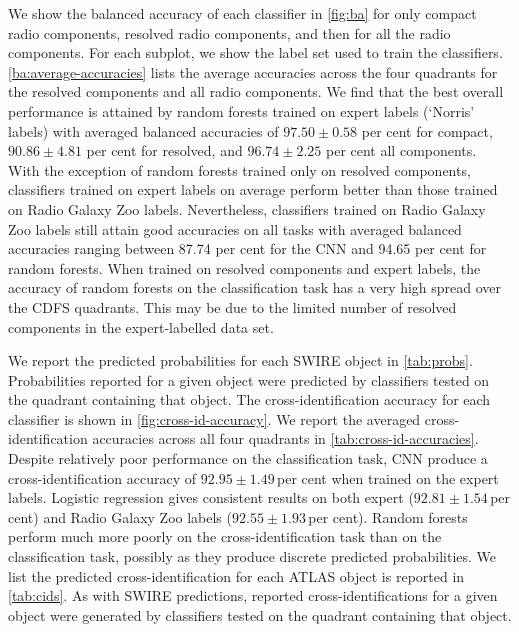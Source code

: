 \documentclass[fleqn,usenatbib,usedcolumn]{mnras}
\begin{document}
  We show the balanced accuracy of each classifier in \autoref{fig:ba} for only compact radio components, resolved radio components, and then for all the radio components. For each subplot, we show the label set used to train the classifiers. \autoref{ba:average-accuracies} lists the average accuracies across the four quadrants for the resolved components and all radio components. We find that the
  best overall performance is attained by random forests trained on expert
  labels (`Norris' labels) with averaged balanced accuracies of $97.50 \pm 0.58$ per cent for compact, $90.86 \pm 4.81$ per cent for resolved, and $96.74 \pm 2.25$ per cent all components. With the exception of random forests trained only on resolved
  components, classifiers trained on expert labels on average perform better
  than those trained on Radio Galaxy Zoo labels. Nevertheless, classifiers
  trained on Radio Galaxy Zoo labels still attain good accuracies on
  all tasks with averaged balanced accuracies ranging between 87.74 per cent for the CNN and 94.65 per cent for random forests.  When trained on resolved components and expert labels,
  the accuracy of random forests on the classification task has a very high
  spread over the CDFS quadrants. This may be due to the limited number of
  resolved components in the expert-labelled data set.

  We report the predicted probabilities for each SWIRE object in \autoref{tab:probs}. Probabilities reported for a given object
  were predicted by classifiers tested on the quadrant containing that object. The cross-identification accuracy for each classifier is shown in
  \autoref{fig:cross-id-accuracy}. We report the averaged cross-identification accuracies across all four quadrants in \autoref{tab:cross-id-accuracies}. Despite relatively poor performance on the
  classification task, CNN produce a cross-identification accuracy of $92.95 \pm 1.49$\,per cent when trained on the expert labels. Logistic regression gives consistent results on both expert ($92.81 \pm 1.54$\,per cent) and Radio Galaxy Zoo labels ($92.55 \pm 1.93$\,per cent). Random forests perform
  much more poorly on the cross-identification task than on the classification
  task, possibly as they produce discrete predicted probabilities. We list the predicted cross-identification for each ATLAS object is reported in
  \autoref{tab:cids}. As with SWIRE predictions, reported cross-identifications
  for a given object were generated by classifiers tested on the quadrant
  containing that object. 
  
\end{document}
